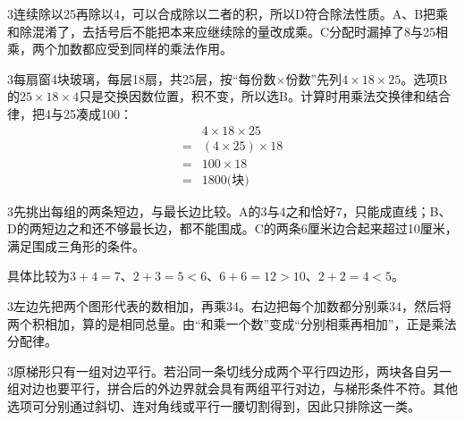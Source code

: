 \documentclass[multi=snippet,border={5bp 20bp 5bp 5bp}]{standalone}
\newenvironment{snippet}[3]{\begin{minipage}{#1bp}\color{answerred}\fontsize{#2}{#3}\selectfont\raggedright}{\end{minipage}}
\begin{document}
\begin{snippet}{505}{11.5}{14}\begin{multicols}{3}\raggedcolumns 连续除以25再除以4，可以合成除以二者的积，所以D符合除法性质。A、B把乘和除混淆了，去括号后不能把本来应继续除的量改成乘。C分配时漏掉了8与25相乘，两个加数都应受到同样的乘法作用。\end{multicols}\end{snippet}
\begin{snippet}{505}{11.5}{14}\begin{multicols}{3}\raggedcolumns 每扇窗4块玻璃，每层18扇，共25层，按“每份数\(\times\)\allowbreak 份数”先列\(4\times18\times25\)\allowbreak 。选项B的\(25\times18\times4\)\allowbreak 只是交换因数位置，积不变，所以选B。计算时用乘法交换律和结合律，把4与25凑成100：\[\begin{aligned}&4\times18\times25\\={}&(4\times25)\times18\\={}&100\times18\\={}&1800\text{(块)}\end{aligned}\]\end{multicols}\end{snippet}
\begin{snippet}{505}{11.5}{14}\begin{multicols}{3}\raggedcolumns 先挑出每组的两条短边，与最长边比较。A的3与4之和恰好7，只能成直线；B、D的两短边之和还不够最长边，都不能围成。C的两条6厘米边合起来超过10厘米，满足围成三角形的条件。\par 具体比较为\(3+4=7\)\allowbreak 、\(2+3=5<6\)\allowbreak 、\(6+6=12>10\)\allowbreak 、\(2+2=4<5\)\allowbreak 。\end{multicols}\end{snippet}
\begin{snippet}{505}{11.5}{14}\begin{multicols}{3}\raggedcolumns 左边先把两个图形代表的数相加，再乘34。右边把每个加数都分别乘34，然后将两个积相加，算的是相同总量。由“和乘一个数”变成“分别相乘再相加”，正是乘法分配律。\end{multicols}\end{snippet}
\begin{snippet}{505}{11.5}{14}\begin{multicols}{3}\raggedcolumns 原梯形只有一组对边平行。若沿同一条切线分成两个平行四边形，两块各自另一组对边也要平行，拼合后的外边界就会具有两组平行对边，与梯形条件不符。其他选项可分别通过斜切、连对角线或平行一腰切割得到，因此只排除这一类。\end{multicols}\end{snippet}
\end{document}
